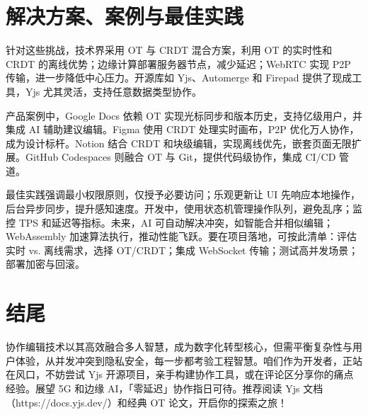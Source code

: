 \chapter{解决方案、案例与最佳实践}
针对这些挑战，技术界采用 OT 与 CRDT 混合方案，利用 OT 的实时性和 CRDT 的离线优势；边缘计算部署服务器节点，减少延迟；WebRTC 实现 P2P 传输，进一步降低中心压力。开源库如 Yjs、Automerge 和 Firepad 提供了现成工具，Yjs 尤其灵活，支持任意数据类型协作。\par
产品案例中，Google Docs 依赖 OT 实现光标同步和版本历史，支持亿级用户，并集成 AI 辅助建议编辑。Figma 使用 CRDT 处理实时画布，P2P 优化万人协作，成为设计标杆。Notion 结合 CRDT 和块级编辑，实现离线优先，嵌套页面无限扩展。GitHub Codespaces 则融合 OT 与 Git，提供代码级协作，集成 CI/CD 管道。\par
最佳实践强调最小权限原则，仅授予必要访问；乐观更新让 UI 先响应本地操作，后台异步同步，提升感知速度。开发中，使用状态机管理操作队列，避免乱序；监控 TPS 和延迟等指标。未来，AI 可自动解决冲突，如智能合并相似编辑；WebAssembly 加速算法执行，推动性能飞跃。要在项目落地，可按此清单：评估实时 vs. 离线需求，选择 OT/CRDT；集成 WebSocket 传输；测试高并发场景；部署加密与回滚。\par
\chapter{结尾}
协作编辑技术以其高效融合多人智慧，成为数字化转型核心，但需平衡复杂性与用户体验，从并发冲突到隐私安全，每一步都考验工程智慧。咱们作为开发者，正站在风口，不妨尝试 Yjs 开源项目，亲手构建协作工具，或在评论区分享你的痛点经验。展望 5G 和边缘 AI，「零延迟」协作指日可待。推荐阅读 Yjs 文档（https://docs.yjs.dev/）和经典 OT 论文，开启你的探索之旅！\par
